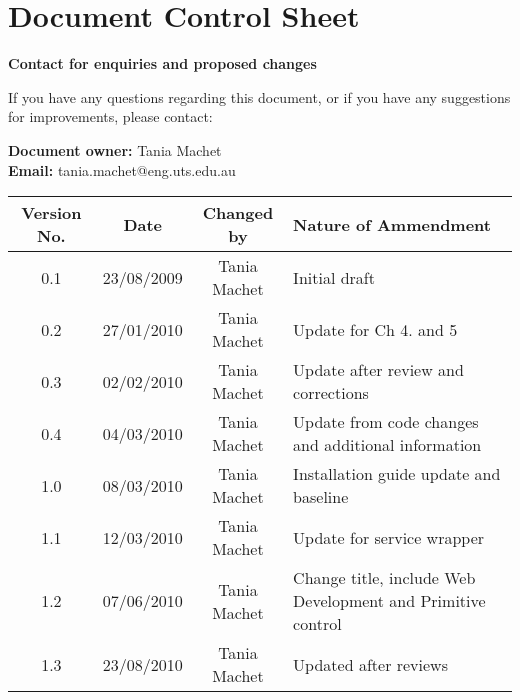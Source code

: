 \chapter*{Document Control Sheet} 
{\bf Contact for enquiries and proposed changes} 

If you have any questions regarding this document, or if you have any suggestions for improvements, please contact:

\vspace{1cm}
{\bf Document owner:} Tania Machet \\
{\bf Email:} tania.machet@eng.uts.edu.au

\vspace{1.5cm}
\begin{tabular}[b]{|c|c|c|p{5.5cm}|}
  \hline
	\bf Version No.& \bf Date & \bf Changed by & \bf Nature of Ammendment\\ \hline
	0.1 & 23/08/2009 & Tania Machet & Initial draft \\ \hline
	0.2 & 27/01/2010 & Tania Machet & Update for Ch 4. and 5 \\ \hline
	0.3 & 02/02/2010 & Tania Machet & Update after review and  corrections \\ \hline
	0.4 & 04/03/2010 & Tania Machet & Update from code changes and additional information \\ \hline
	1.0 & 08/03/2010 & Tania Machet & Installation guide update and baseline \\ \hline
	1.1 & 12/03/2010 & Tania Machet & Update for service wrapper \\ \hline
	1.2 & 07/06/2010 & Tania Machet & Change title, include Web Development and Primitive control \\ \hline
	1.3 & 23/08/2010 & Tania Machet & Updated after reviews \\ \hline
\end{tabular}